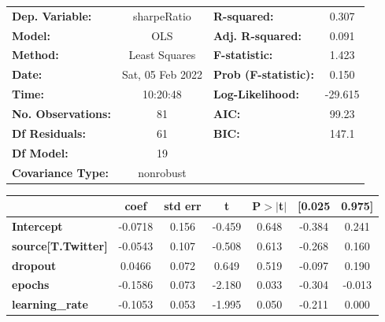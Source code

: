 \begin{center}
\begin{tabular}{lclc}
\toprule
\textbf{Dep. Variable:}                   &   sharpeRatio    & \textbf{  R-squared:         } &     0.307   \\
\textbf{Model:}                           &       OLS        & \textbf{  Adj. R-squared:    } &     0.091   \\
\textbf{Method:}                          &  Least Squares   & \textbf{  F-statistic:       } &     1.423   \\
\textbf{Date:}                            & Sat, 05 Feb 2022 & \textbf{  Prob (F-statistic):} &    0.150    \\
\textbf{Time:}                            &     10:20:48     & \textbf{  Log-Likelihood:    } &   -29.615   \\
\textbf{No. Observations:}                &          81      & \textbf{  AIC:               } &     99.23   \\
\textbf{Df Residuals:}                    &          61      & \textbf{  BIC:               } &     147.1   \\
\textbf{Df Model:}                        &          19      & \textbf{                     } &             \\
\textbf{Covariance Type:}                 &    nonrobust     & \textbf{                     } &             \\
\bottomrule
\end{tabular}
\begin{tabular}{lcccccc}
                                          & \textbf{coef} & \textbf{std err} & \textbf{t} & \textbf{P$> |$t$|$} & \textbf{[0.025} & \textbf{0.975]}  \\
\midrule
\textbf{Intercept}                        &      -0.0718  &        0.156     &    -0.459  &         0.648        &       -0.384    &        0.241     \\
\textbf{source[T.Twitter]}                &      -0.0543  &        0.107     &    -0.508  &         0.613        &       -0.268    &        0.160     \\
\textbf{dropout}                          &       0.0466  &        0.072     &     0.649  &         0.519        &       -0.097    &        0.190     \\
\textbf{epochs}                           &      -0.1586  &        0.073     &    -2.180  &         0.033        &       -0.304    &       -0.013     \\
\textbf{learning\_rate}                   &      -0.1053  &        0.053     &    -1.995  &         0.050        &       -0.211    &        0.000     \\

\end{tabular}
\end{center}
